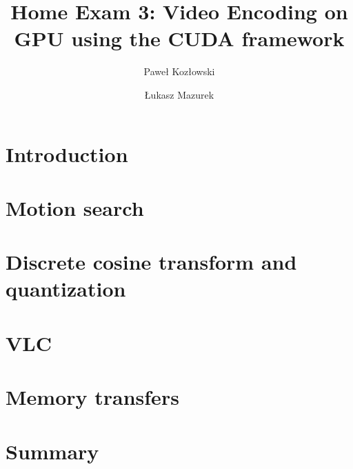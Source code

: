 \documentclass[11pt]{article}
\title{Home Exam 3: Video Encoding on GPU using the CUDA framework}
\author{Paweł Kozłowski \and Łukasz Mazurek}
\begin{document}
\maketitle

\section{Introduction}

\section{Motion search}

\section{Discrete cosine transform and quantization}

\section{VLC}

\section{Memory transfers}

\section{Summary}
\end{document}
